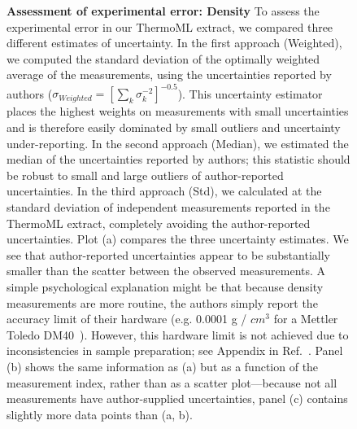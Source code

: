 \documentclass[aps,pre,twocolumn,nofootinbib,superscriptaddress,linenumbers]{revtex4-1}
\begin{document}

\clearpage

\begin{figure}



\caption{{\bf Assessment of experimental error: Density}
To assess the experimental error in our ThermoML extract, we compared three different estimates of uncertainty.  
In the first approach (Weighted), we computed the standard deviation of the optimally weighted average of the measurements, using the uncertainties reported by authors ($\sigma_{Weighted} = [\sum_k \sigma_k^{-2}]^{-0.5}$).
This uncertainty estimator places the highest weights on measurements with small uncertainties and is therefore easily dominated by small outliers and uncertainty under-reporting.
In the second approach (Median), we estimated the median of the uncertainties reported by authors; this statistic should be robust to small and large outliers of author-reported uncertainties.
In the third approach (Std), we calculated at the standard deviation of independent measurements reported in the ThermoML extract, completely avoiding the author-reported uncertainties.
Plot (a) compares the three uncertainty estimates.
We see that author-reported uncertainties appear to be substantially smaller than the scatter between the observed measurements.
A simple psychological explanation might be that because density measurements are more routine, the authors simply report the accuracy limit of their hardware (e.g. 0.0001 g / $cm^{3}$ for a Mettler Toledo DM40~\cite{mettlertoledo}).  
However, this hardware limit is not achieved due to inconsistencies in sample preparation; see Appendix in Ref.~\cite{chirico2013improvement}.  
Panel (b) shows the same information as (a) but as a function of the measurement index, rather than as a scatter plot---because not all measurements have author-supplied uncertainties, panel (c) contains slightly more data points than (a, b).  
}
\label{figure:ErrorAnalysisDensity}

\end{figure}
\end{document}
